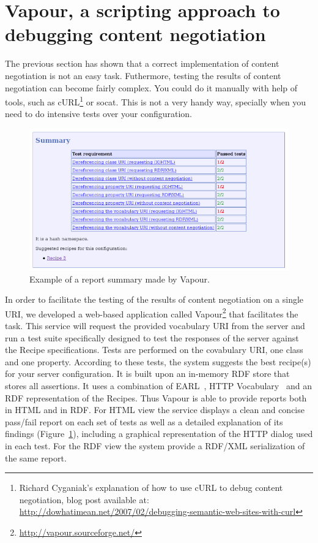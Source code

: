 \documentclass{../templates/llncs}
\begin{document}

\section{\label{sec:vapour}Vapour, a scripting approach to debugging content negotiation}

The previous section has shown that a correct implementation of content negotiation 
is not an easy task. Futhermore, testing the results of content negotiation can become 
fairly complex. You could do it manually with help of tools, such as 
cURL\footnote{Richard Cyganiak's explanation of how to use cURL to debug content negotiation, 
blog post available at: \url{http://dowhatimean.net/2007/02/debugging-semantic-web-sites-with-curl}}
or socat. This is not a very handy way, specially when you need to do 
intensive tests over your configuration.

\begin{figure}
 \centering
 \includegraphics[width=12cm]{images/report-summary.png}
 \caption{\label{fig:report-summary}Example of a report summary made by Vapour.}
\end{figure}

In order to facilitate the testing of the results of content negotiation on a single 
URI, we developed a web-based application called Vapour\footnote{\url{http://vapour.sourceforge.net/}}
that facilitates the task. This service will request the provided vocabulary 
URI from the server and run a test suite specifically designed to test the responses 
of the server against the Recipe specifications. Tests are performed on the covabulary
URI, one class and one property. According to these tests, the system suggests the 
best recipe(s) for your server configuration. It is built upon an in-memory RDF store
that stores all assertions. It uses a combination of EARL~\cite{EARL}, HTTP
Vocabulary~\cite{Koch2007} and an RDF representation of the Recipes. Thus Vapour 
is able to provide reports both in HTML and in RDF. For HTML view the service 
displays a clean and concise pass/fail report on each set of tests 
as  well as a detailed explanation of its  findings (Figure~\ref{fig:report-summary}), 
including a graphical representation of the HTTP dialog used in each test.
For the RDF view %
the system provide a RDF/XML serialization of the same report.
\end{document}
